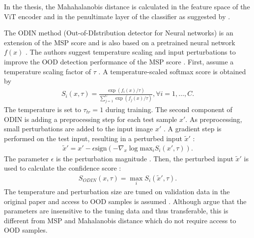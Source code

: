 In the thesis, the Mahahalanobis distance is calculated in the feature space of the ViT encoder and in the penultimate layer of the classifier as suggested by \citep{Lee2018, Michels2023}.
\par
The ODIN method (Out-of-DIstribution detector for Neural networks) is an extension of the MSP score and is also based on a pretrained neural network $f(x)$ \citep{Liang2018}.
The authors suggest temperature scaling and input perturbations to improve the OOD detection performance of the MSP score \citep{Liang2018}.
First, assume a temperature scaling factor of $\tau$ \citep{Liang2018}.
A temperature-scaled softmax score is obtained by \citep{Liang2018}
\begin{align}
	S_i(x,\tau) = \frac{\exp(f_i(x)/\tau)}{\sum_{j=1}^{C}\exp(f_j(x)/\tau)}, \forall i=1,\dots,C.
\end{align}
The temperature is set to $\tau_{tr}=1$ \citep{Liang2018} during training.
The second component of ODIN is adding a preprocessing step for each test sample $x'$.
As preprocessing, small perturbations are added to the input image $x'$ \citep{Liang2018}.
A gradient step is performed on the test input, resulting in a perturbed input $\tilde{x}'$ \citep{Liang2018}: 
\begin{align}
	\tilde{x}' = x' - \epsilon \text{sign}(-\nabla_x \log \text{max}_i  S_i(x',\tau)).
\end{align}
The parameter $\epsilon$ is the perturbation magnitude \citep{Liang2018}.
Then, the perturbed input $\tilde{x}'$ is used to calculate the confidence score \citep{Liang2018}:
\begin{align}
	S_{ODIN}(x,\tau) = \max_i S_i(\tilde{x}',\tau).
\end{align}
The temperature and perturbation size are tuned on validation data in the original paper and access to OOD samples is assumed \citep{Liang2018,Hsu2020}. 
Although \citep{Liang2018} argue that the parameters are insensitive to the tuning data and thus transferable, this is different from MSP and Mahalanobis distance which do not require access to OOD samples.

